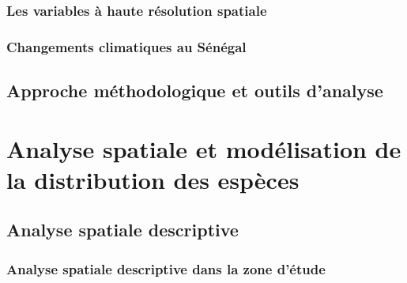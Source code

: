 \documentclass[a4paper, oneside, 12pt]{book}
\begin{document}
\section{Les variables à haute résolution spatiale}
\section{Changements climatiques au Sénégal}


\chapter{Approche méthodologique et outils d'analyse}

\part{Analyse spatiale  et modélisation de la distribution des espèces}
\chapter{Analyse spatiale descriptive }
\section{Analyse spatiale descriptive dans la zone d'étude}
\end{document}
